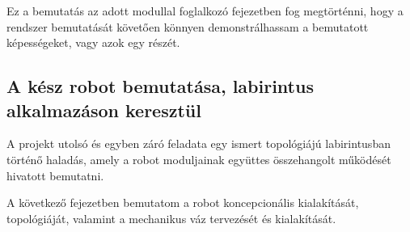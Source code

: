 Ez a bemutatás az adott modullal foglalkozó fejezetben fog megtörténni, hogy a
rendszer bemutatását követően könnyen demonstrálhassam a bemutatott képességeket,
vagy azok egy részét.

\subsection{A kész robot bemutatása, labirintus alkalmazáson keresztül}

A projekt utolsó és egyben záró feladata egy ismert topológiájú labirintusban
történő haladás, amely a robot moduljainak együttes összehangolt működését
hivatott bemutatni. 


\medskip

A következő fejezetben bemutatom a robot koncepcionális kialakítását,
topológiáját, valamint a mechanikus váz tervezését és kialakítását.
